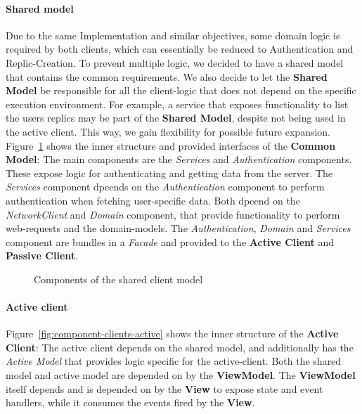 \paragraph{Shared model}
Due to the same Implementation and similar objectives, some domain logic is required by both clients, which can essentially be reduced to Authentication and Replic-Creation.
To prevent multiple logic, we decided to have a shared model that contains the common requirements.
We also decide to let the \textbf{Shared Model} be responsible for all the client-logic that does not depend on the specific execution environment.
For example, a service that exposes functionality to list the users replics may be part of the \textbf{Shared Model}, despite not being used in the active client.
This way, we gain flexibility for possible future expansion. \newline
Figure~\ref{fig:component-clients-shared} shows the inner structure and provided interfaces of the \textbf{Common Model}:
The main components are the \textit{Services} and \textit{Authentication} components.
These expose logic for authenticating and getting data from the server.
The \textit{Services} component dpeends on the \textit{Authentication} component to perform authentication when fetching user-specific data.
Both dpeend on the \textit{NetworkClient} and \textit{Domain} component, that provide functionality to perform web-requests and the domain-models.
The \textit{Authentication}, \textit{Domain} and \textit{Services} component are bundles in a \textit{Facade} and provided to the \textbf{Active Client} and \textbf{Passive Client}.

\begin{figure}
    \centering
    \caption{Components of the shared client model}
    \label{fig:component-clients-shared}
\end{figure}

\paragraph{Active client}
Figure~\ref{fig:component-clients-active} shows the inner structure of the \textbf{Active Client}: The active client depends on the shared model, and additionally has the \textit{Active Model} that provides logic specific for the active-client.
Both the shared model and active model are depended on by the \textbf{ViewModel}.
The \textbf{ViewModel} itself depends and is depended on by the \textbf{View} to expose state and event handlers, while it consumes the events fired by the \textbf{View}.

